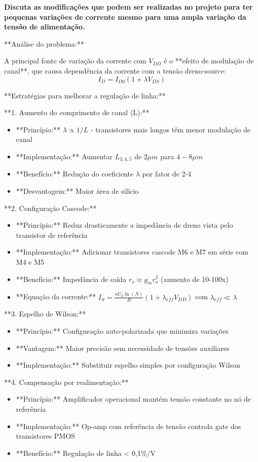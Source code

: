 \documentclass[12pt,a4paper]{article}
\begin{document}
\textbf{Discuta as modificações que podem ser realizadas no projeto para ter pequenas variações de corrente mesmo para uma ampla variação da tensão de alimentação.}

**Análise do problema:**

A principal fonte de variação da corrente com $V_{DD}$ é o **efeito de modulação de canal**, que causa dependência da corrente com a tensão dreno-source:
$$I_D = I_{D0}(1 + \lambda V_{DS}) $$

**Estratégias para melhorar a regulação de linha:**

**1. Aumento do comprimento de canal (L):**
\begin{itemize}
    \item **Princípio:** $\lambda \propto 1/L$ - transistores mais longos têm menor modulação de canal
    \item **Implementação:** Aumentar $L_{3,4,5}$ de $2\mu m$ para $4-8\mu m$
    \item **Benefício:** Redução do coeficiente $\lambda$ por fator de 2-4
    \item **Desvantagem:** Maior área de silício
\end{itemize}

**2. Configuração Cascode:**
\begin{itemize}
    \item **Princípio:** Reduz drasticamente a impedância de dreno vista pelo transistor de referência
    \item **Implementação:** Adicionar transistores cascode M6 e M7 em série com M4 e M5
    \item **Benefício:** Impedância de saída $r_o \approx g_m r_o^2$ (aumento de 10-100x)
    \item **Equação da corrente:** $I_S = \frac{nU_T \ln(N)}{R}(1 + \lambda_{eff} V_{DD})$ com $\lambda_{eff} \ll \lambda$
\end{itemize}

**3. Espelho de Wilson:**
\begin{itemize}
    \item **Princípio:** Configuração auto-polarizada que minimiza variações
    \item **Vantagem:** Maior precisão sem necessidade de tensões auxiliares
    \item **Implementação:** Substituir espelho simples por configuração Wilson
\end{itemize}

**4. Compensação por realimentação:**
\begin{itemize}
    \item **Princípio:** Amplificador operacional mantém tensão constante no nó de referência
    \item **Implementação:** Op-amp com referência de tensão controla gate dos transistores PMOS
    \item **Benefício:** Regulação de linha < 0,1\%/V
\end{itemize}
\end{document}
